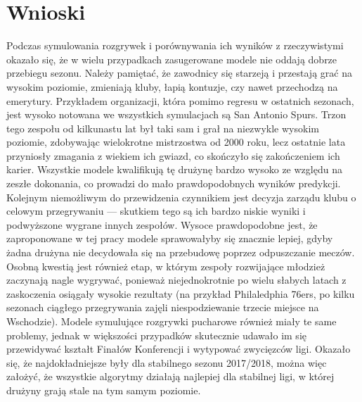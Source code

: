 \documentclass[inzynierska]{pwr_wmat_praca_dyplomowa}
\theoremstyle{plain}
\numberwithin{theorem}{chapter}
\theoremstyle{definition}
\numberwithin{theorem}{chapter}
\begin{document}
\chapter{Wnioski}
Podczas symulowania rozgrywek i porównywania ich wyników z rzeczywistymi okazało się, że w wielu przypadkach zasugerowane modele nie oddają dobrze przebiegu sezonu. Należy pamiętać, że zawodnicy się starzeją i przestają grać na wysokim poziomie, zmieniają kluby, łapią kontuzje, czy nawet przechodzą na emerytury. Przykładem organizacji, która pomimo regresu w ostatnich sezonach, jest wysoko notowana we wszystkich symulacjach są San Antonio Spurs. Trzon tego zespołu od kilkunastu lat był taki sam i grał na niezwykle wysokim poziomie, zdobywając wielokrotne mistrzostwa od 2000 roku, lecz ostatnie lata przyniosły zmagania z wiekiem ich gwiazd, co skończyło się zakończeniem ich karier. Wszystkie modele kwalifikują tę drużynę bardzo wysoko ze względu na zeszłe dokonania, co prowadzi do mało prawdopodobnych wyników predykcji. Kolejnym niemożliwym do przewidzenia czynnikiem jest decyzja zarządu klubu o celowym przegrywaniu --- skutkiem tego są ich bardzo niskie wyniki i podwyższone wygrane innych zespołów. Wysoce prawdopodobne jest, że zaproponowane w tej pracy modele sprawowałyby się znacznie lepiej, gdyby żadna drużyna nie decydowała się na przebudowę poprzez odpuszczanie meczów. Osobną kwestią jest również etap, w którym zespoły rozwijające młodzież zaczynają nagle wygrywać, ponieważ niejednokrotnie po wielu słabych latach z zaskoczenia osiągały wysokie rezultaty (na przykład Philaledphia 76ers, po kilku sezonach ciągłego przegrywania zajęli niespodziewanie trzecie miejsce na Wschodzie). Modele symulujące rozgrywki pucharowe również miały te same problemy, jednak w większości przypadków skutecznie udawało im się przewidywać kształt Finałów Konferencji i wytypować zwycięzców ligi. Okazało się, że najdokładniejsze były dla stabilnego sezonu 2017/2018, można więc założyć, że wszystkie algorytmy działają najlepiej dla stabilnej ligi, w której drużyny grają stale na tym samym poziomie.
\end{document}
